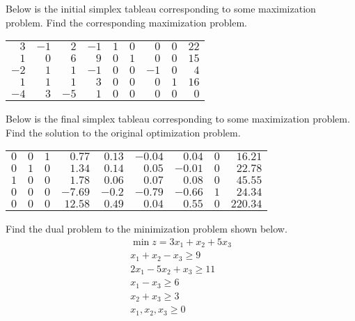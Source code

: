 \documentclass[12pt,letterpaper]{exam}
\begin{document}
\begin{questions}
\newpage
\question[10] Below is the initial simplex tableau corresponding to some maximization problem. Find the corresponding maximization problem. \par
	\begin{table}[!ht]
	\centering
	\begin{tabular}{rrrrrrrrr}
	$3$ & $-1$ & $2$ & $-1$ & $1$ & $0$ & $0$ & $0$ & $22$ \\
	$1$ & $0$ & $6$ & $9$ & $0$ & $1$ & $0$ & $0$ & $15$ \\
	$-2$ & $1$ & $1$ & $-1$ & $0$ & $0$ & $-1$ & $0$ & $4$ \\
	$1$ & $1$ & $1$& $3$ & $0$ & $0$& $0$ & $1$ & $16$ \\
	$-4$ & $3$ & $-5$ & $1$ & $0$ & $0$ & $0$ & $0$ & $0$
	\end{tabular}
	\end{table}



\newpage
\question[10] Below is the final simplex tableau corresponding to some maximization problem. Find the solution to the original optimization problem. \par
	\begin{table}[!ht]
	\centering
	\begin{tabular}{rrrrrrrrr}
	$0$ & $0$ & $1$ & $0.77$ & $0.13$ & $-0.04$ & $0.04$ & $0$ & $16.21$ \\
	$0$ & $1$ & $0$ & $1.34$ & $0.14$ & $0.05$ & $-0.01$ & $0$ & $22.78$ \\
	$1$ & $0$ & $0$ & $1.78$ & $0.06$ & $0.07$ & $0.08$ & $0$ & $45.55$ \\
	$0$ & $0$ & $0$ & $-7.69$ & $-0.2$ & $-0.79$ & $-0.66$ & $1$ & $24.34$ \\
	$0$ & $0$ & $0$ & $12.58$ & $0.49$ & $0.04$ & $0.55$ & $0$ & $220.34$ 	
	\end{tabular}
	\end{table}



\newpage
\question[10] Find the dual problem to the minimization problem shown below. 
	\[
	\begin{gathered}
	\min z= 3x_1 + x_2 + 5x_3 \\
	x_1 + x_2 - x_3 \geq 9 \\
	2x_1 - 5x_2 + x_3 \geq 11 \\
	x_1 - x_3 \geq 6 \\
	x_2 + x_3 \geq 3 \\
	x_1, x_2, x_3 \geq 0 
	\end{gathered}
	\]


\end{questions}
\end{document}
